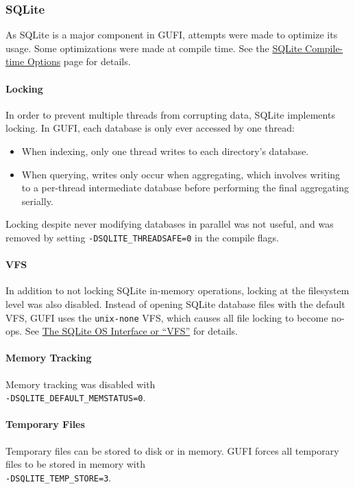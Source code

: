 \subsubsection{SQLite}
As SQLite is a major component in GUFI, attempts were made to optimize
its usage. Some optimizations were made at compile time. See the
\href{https://www.sqlite.org/compile.html}{SQLite Compile-time
  Options} page for details.

\paragraph{Locking}
In order to prevent multiple threads from corrupting data, SQLite
implements locking. In GUFI, each database is only ever accessed by
one thread:

\begin{itemize}
\item When indexing, only one thread writes to each directory's
  database.
\item When querying, writes only occur when aggregating, which
  involves writing to a per-thread intermediate database before
  performing the final aggregating serially.
\end{itemize}

Locking despite never modifying databases in parallel was not useful,
and was removed by setting \texttt{-DSQLITE\_THREADSAFE=0} in the
compile flags.

\paragraph{VFS}
In addition to not locking SQLite in-memory operations, locking at the
filesystem level was also disabled. Instead of opening SQLite database
files with the default VFS, GUFI uses the \texttt{unix-none} VFS,
which causes all file locking to become no-ops. See
\href{https://www.sqlite.org/vfs.html}{The SQLite OS Interface or
  ``VFS''} for details.

\paragraph{Memory Tracking}
Memory tracking was disabled with \\
\noindent \texttt{-DSQLITE\_DEFAULT\_MEMSTATUS=0}.

\paragraph{Temporary Files}
Temporary files can be stored to disk or in memory. GUFI forces all
temporary files to be stored in memory with \\
\texttt{-DSQLITE\_TEMP\_STORE=3}.

